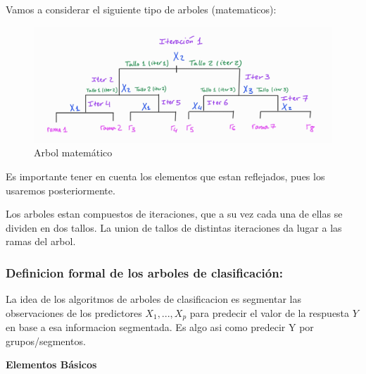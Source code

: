 \documentclass[
  11pt,
  a4paper,
]{article}
\begin{document}
Vamos a considerar el siguiente tipo de arboles (matematicos):

\begin{figure}
\centering
\includegraphics{output_397_0.jpg}
\caption{Arbol matemático}
\end{figure}

Es importante tener en cuenta los elementos que estan reflejados, pues
los usaremos posteriormente.

Los arboles estan compuestos de iteraciones, que a su vez cada una de
ellas se dividen en dos tallos. La union de tallos de distintas
iteraciones da lugar a las ramas del arbol.

\newpage

\hypertarget{definicion-formal-de-los-arboles-de-clasificaciuxf3n}{%
\subsubsection{Definicion formal de los arboles de
clasificación:}\label{definicion-formal-de-los-arboles-de-clasificaciuxf3n}}

La idea de los algoritmos de arboles de clasificacion es segmentar las
observaciones de los predictores \(X_1,...,X_p\) para predecir el valor
de la respuesta \(Y\) en base a esa informacion segmentada. Es algo asi
como predecir Y por grupos/segmentos.

\vspace{1cm}

\textbf{Elementos Básicos}
\end{document}
